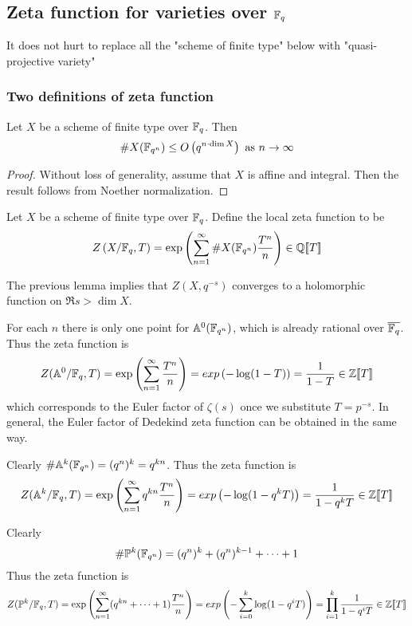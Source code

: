 \subsection{Zeta function for varieties over $\mathbb{F}_q$}
It does not hurt to replace all the "scheme of finite type" below with "quasi-projective variety"
\subsubsection{Two definitions of zeta function}
\begin{lem}
Let $X$ be a scheme of finite type over $\mathbb{F}_q$. Then
\[
\#X(\mathbb{F}_{q^n}) \leq O\left(q^{n \cdot \dim X}\right) \text{ as $n \to \infty$}
\]
\end{lem}
\begin{proof}
Without loss of generality, assume that $X$ is affine and integral. Then the result follows from Noether normalization.
\end{proof}
\begin{defn}
Let $X$ be a scheme of finite type over $\mathbb{F}_q$. Define the local zeta function to be 
\[
Z\left(X/\mathbb{F}_q, T\right) = \exp\left(\sum_{n=1}^{\infty} \# X(\mathbb{F}_{q^n}) \frac{T^n}{n}\right) \in \mathbb{Q}[\![T]\!]
\]
\end{defn}
\begin{rem}
The previous lemma implies that $Z(X, q^{-s})$ converges to a holomorphic function on $\Re s > \dim X$.
\end{rem}
\begin{ex}[$\bA^0 = Spec(\FF_q)$]
For each $n$ there is only one point for $\mathbb{A}^0(\mathbb{F}_{q^n})$, which is already rational over $\overline{\mathbb{F}_q}$. Thus the zeta function is
\[
Z(\mathbb{A}^0/\mathbb{F}_q, T) = \exp\left(\sum_{n=1}^{\infty} \frac{T^n}{n}\right) = exp\left(-\log (1-T)\right) = \frac{1}{1-T} \in \mathbb{Z}[\![T]\!]
\]
which corresponds to the Euler factor of $\zeta(s)$ once we substitute $T = p^{-s}$. In general, the Euler factor of Dedekind zeta function can be obtained in the same way.
\end{ex}
\begin{ex}[{$\bA^k$}]
Clearly $\# \mathbb{A}^k(\mathbb{F}_{q^n}) = (q^n)^k = q^{kn}$. Thus the zeta function is
\[
Z(\mathbb{A}^k/\mathbb{F}_q, T) = \exp\left(\sum_{n=1}^{\infty} q^{kn}\frac{T^n}{n}\right) = exp\left(-\log (1-q^k T)\right) = \frac{1}{1-q^k T} \in \mathbb{Z}[\![T]\!]
\]
\end{ex}
\begin{ex}[$\PP^k$]
Clearly 
\[
\# \mathbb{P}^k (\mathbb{F}_{q^n}) = (q^n)^k + (q^n)^{k-1} + \cdots + 1
\]
Thus the zeta function is
\[
Z(\mathbb{P}^k/\mathbb{F}_q, T) = \exp\left(\sum_{n=1}^{\infty} (q^{kn} + \cdots + 1)\frac{T^n}{n}\right) = exp\left(- \sum_{i=0}^k \log (1-q^i T)\right) = \prod_{i=1}^k \frac{1}{1-q^i T} \in \mathbb{Z}[\![T]\!]
\]
\end{ex}
